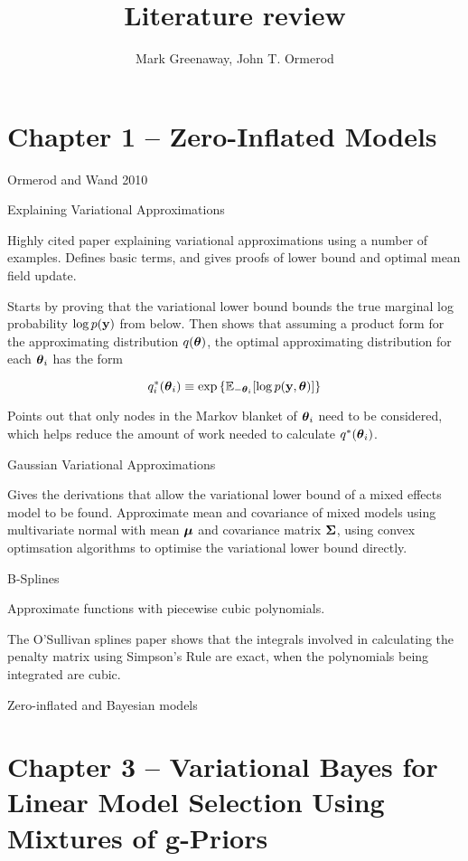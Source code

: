\documentclass{amsart}[12pt]
\title{Literature review}
\author{Mark Greenaway, John T. Ormerod}
\begin{document}
\maketitle

\section{Chapter 1 -- Zero-Inflated Models}

Ormerod and Wand 2010

Explaining Variational Approximations

Highly cited paper explaining variational approximations using a number of examples.
Defines basic terms, and gives proofs of lower bound and optimal mean field update.

Starts by proving that the variational lower bound  bounds the true marginal log probability $\log p({\bf y})$
from below. Then shows that assuming a product form for the approximating distribution $q({\boldsymbol \theta})$, the
optimal approximating distribution for each ${\boldsymbol \theta}_i$ has the form

\[
	q_i^*({\boldsymbol \theta}_i) \equiv \exp{\{\mathbb{E}_{-{\boldsymbol\theta}_i}[\log p({\bf y}, {\boldsymbol\theta})]\}}
\]

Points out that only nodes in the Markov blanket of ${\boldsymbol \theta}_i$ need to be considered, which helps reduce the
amount of work needed to calculate $q^*({\boldsymbol \theta}_i)$.

Gaussian Variational Approximations

Gives the derivations that allow the variational lower bound of a mixed effects model to be found. Approximate
mean and covariance of mixed models using multivariate normal with mean ${\boldsymbol \mu}$ and covariance matrix
${\boldsymbol \Sigma}$, using convex optimsation algorithms to optimise the variational lower bound directly.

B-Splines

Approximate functions with piecewise cubic polynomials.

The O'Sullivan splines paper shows that the integrals involved in calculating the penalty matrix using Simpson's Rule are exact, when the polynomials being integrated are cubic.

Zero-inflated and Bayesian models

\section{Chapter 3 -- Variational Bayes for Linear Model Selection Using Mixtures of g-Priors}
\end{document}
